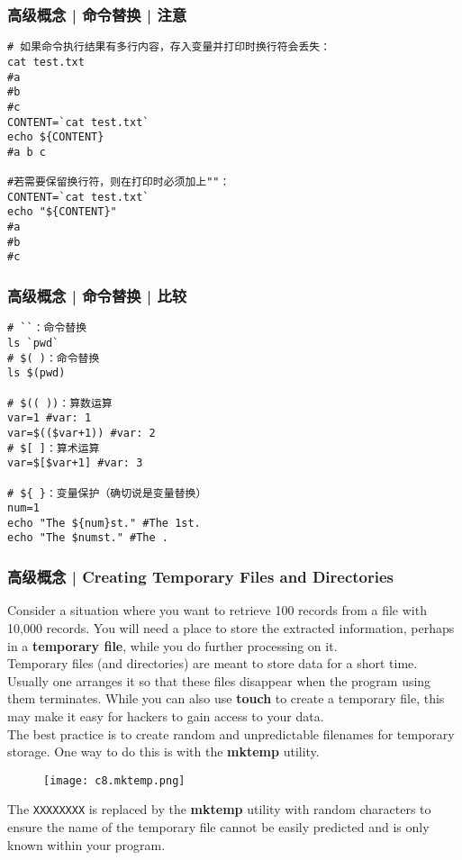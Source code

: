 \begin{frame}[fragile]
  \frametitle{高级概念 | 命令替换 | \alert{注意}}
\begin{lstlisting}
# 如果命令执行结果有多行内容，存入变量并打印时换行符会丢失：
cat test.txt
#a
#b
#c
CONTENT=`cat test.txt`
echo ${CONTENT}
#a b c

#若需要保留换行符，则在打印时必须加上""：
CONTENT=`cat test.txt`
echo "${CONTENT}"      
#a
#b
#c
\end{lstlisting}
\end{frame}

\begin{frame}[fragile]
  \frametitle{高级概念 | 命令替换 | \alert{比较}}
\begin{lstlisting}
# ``：命令替换
ls `pwd`
# $( )：命令替换
ls $(pwd)

# $(( ))：算数运算
var=1 #var: 1
var=$(($var+1)) #var: 2
# $[ ]：算术运算
var=$[$var+1] #var: 3

# ${ }：变量保护（确切说是变量替换）
num=1
echo "The ${num}st." #The 1st.
echo "The $numst." #The .
\end{lstlisting}
\end{frame}

\begin{frame}[fragile]
  \frametitle{高级概念 | Creating Temporary Files and Directories}
  {\footnotesize
  Consider a situation where you want to retrieve 100 records from a file with 10,000 records. You will need a place to store the extracted information, perhaps in a \textbf{temporary file}, while you do further processing on it.\\
  \vspace{0.1cm}
  Temporary files (and directories) are meant to store data for a short time. Usually one arranges it so that these files disappear when the program using them terminates. While you can also use \textbf{touch} to create a temporary file, this may make it easy for hackers to gain access to your data.\\
  \vspace{0.1cm}
  The best practice is to create random and unpredictable filenames for temporary storage. One way to do this is with the \textbf{mktemp} utility.
  \vspace{-0.3cm}
  \begin{figure}
    \centering
    \texttt{[image: c8.mktemp.png]}
  \end{figure}
  \vspace{-0.3cm}
  The \verb|XXXXXXXX| is replaced by the \textbf{mktemp} utility with random characters to ensure the name of the temporary file cannot be easily predicted and is only known within your program.
  }
\end{frame}

